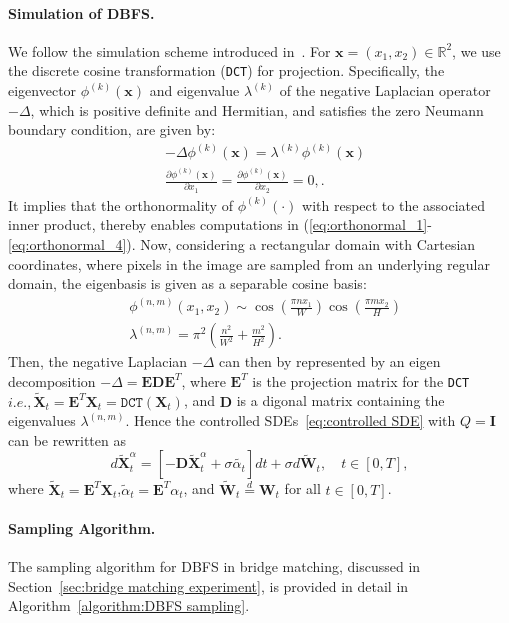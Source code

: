 \documentclass[nohyperref]{article}
\theoremstyle{plain}
\theoremstyle{remark}
\newcommand{\mb}{\mathbf}
\newcommand{\ie}{\textit{i}.\textit{e}., }
\begin{document}
\paragraph{Simulation of DBFS.} We follow the simulation scheme introduced in~\citep{rissanen2023generative,lim2023scorebased}. For $\mb{x} = (x_1, x_2) \in \mathbb{R}^2$, we use the discrete cosine transformation (\texttt{DCT}) for projection. Specifically, the eigenvector $\phi^{(k)}(\mb{x})$  and eigenvalue $\lambda^{(k)}$ of the negative Laplacian operator $-\Delta$, which is positive definite and Hermitian, and satisfies the zero Neumann boundary condition, are given by:
\begin{align}
    & -\Delta \phi^{(k)}(\mb{x}) = \lambda^{(k)} \phi^{(k)}(\mb{x}) \\
    & \frac{\partial \phi^{(k)}(\mb{x})}{\partial x_1} = \frac{\partial \phi^{(k)}(\mb{x})}{\partial x_2} = 0,.
\end{align}
It implies that the orthonormality of $\phi^{(k)}(\cdot)$ with respect to the associated inner product, thereby enables computations in (\ref{eq:orthonormal_1}-\ref{eq:orthonormal_4}). Now, considering a rectangular domain with Cartesian coordinates, where pixels in the image are sampled from an underlying regular domain, the eigenbasis is given as a separable cosine basis:
\begin{align}
    & \phi^{(n, m)}(x_1, x_2) \sim \cos{\left(\frac{\pi n x_1}{W}\right)}\cos{\left(\frac{\pi m x_2}{H}\right)} \\
    & \lambda^{(n, m)} = \pi^2 \left(\frac{n^2}{W^2} + \frac{m^2}{H^2} \right).
\end{align}
Then, the negative Laplacian $-\Delta$ can then by represented by an eigen decomposition $-\Delta = \mb{E}\mb{D}\mb{E}^T$, where $\mb{E}^T$ is the projection matrix for the \texttt{DCT} $\ie \tilde{\mb{X}}_t = \mb{E}^T \mb{X}_t =\texttt{DCT}(\mb{X}_t)$, and $\mb{D}$ is a digonal matrix containing the eigenvalues $\lambda^{(n, m)}$. Hence the controlled SDEs~\eqref{eq:controlled SDE} with $Q=\mb{I}$  can be rewritten as
\begin{equation}
    d\tilde{\mb{X}}^{\alpha}_t = \left[ -\mb{D}\tilde{\mb{X}}^{\alpha}_t  + \sigma \tilde{\alpha_t} \right] dt + \sigma d\tilde{\mb{W}}_t, \quad t \in [0, T],
\end{equation}
where $\tilde{\mb{X}}_t = \mb{E}^T \mb{X}_t$,$\tilde{\alpha}_t = \mb{E}^T \alpha_t$, and $\tilde{\mb{W}}_t \stackrel{d}= \mb{W}_t$ for all $t \in [0, T]$.


\paragraph{Sampling Algorithm. }
The sampling algorithm for DBFS in bridge matching, discussed in Section~\ref{sec:bridge matching experiment}, is provided in detail in Algorithm~\ref{algorithm:DBFS sampling}.
\end{document}
